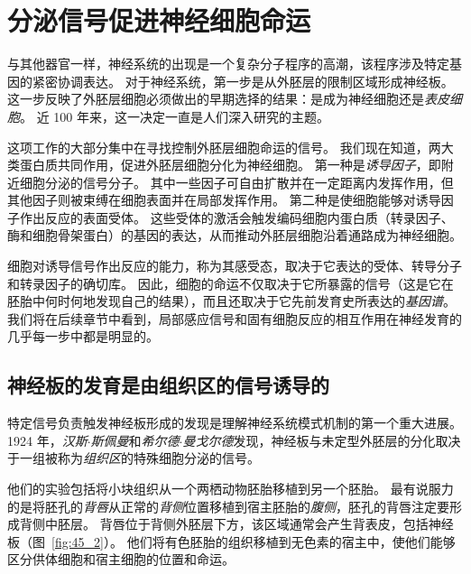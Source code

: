 \section{分泌信号促进神经细胞命运}

与其他器官一样，神经系统的出现是一个复杂分子程序的高潮，该程序涉及特定基因的紧密协调表达。
对于神经系统，第一步是从外胚层的限制区域形成神经板。
这一步反映了外胚层细胞必须做出的早期选择的结果：是成为神经细胞还是\textit{表皮细胞}。
近 100 年来，这一决定一直是人们深入研究的主题。


这项工作的大部分集中在寻找控制外胚层细胞命运的信号。
我们现在知道，两大类蛋白质共同作用，促进外胚层细胞分化为神经细胞。
第一种是\textit{诱导因子}，即附近细胞分泌的信号分子。
其中一些因子可自由扩散并在一定距离内发挥作用，但其他因子则被束缚在细胞表面并在局部发挥作用。
第二种是使细胞能够对诱导因子作出反应的表面受体。
这些受体的激活会触发编码细胞内蛋白质（转录因子、酶和细胞骨架蛋白）的基因的表达，从而推动外胚层细胞沿着通路成为神经细胞。


细胞对诱导信号作出反应的能力，称为其感受态，取决于它表达的受体、转导分子和转录因子的确切库。
因此，细胞的命运不仅取决于它所暴露的信号（这是它在胚胎中何时何地发现自己的结果），而且还取决于它先前发育史所表达的\textit{基因谱}。
我们将在后续章节中看到，局部感应信号和固有细胞反应的相互作用在神经发育的几乎每一步中都是明显的。



\subsection{神经板的发育是由组织区的信号诱导的}

特定信号负责触发神经板形成的发现是理解神经系统模式机制的第一个重大进展。
1924 年，\textit{汉斯$\cdot$斯佩曼}和\textit{希尔德$\cdot$曼戈尔德}发现，神经板与未定型外胚层的分化取决于一组被称为\textit{组织区}的特殊细胞分泌的信号。


他们的实验包括将小块组织从一个两栖动物胚胎移植到另一个胚胎。
最有说服力的是将胚孔的\textit{背唇}从正常的\textit{背侧}位置移植到宿主胚胎的\textit{腹侧}，胚孔的背唇注定要形成背侧中胚层。
背唇位于背侧外胚层下方，该区域通常会产生背表皮，包括神经板（图~\ref{fig:45_2}）。
他们将有色胚胎的组织移植到无色素的宿主中，使他们能够区分供体细胞和宿主细胞的位置和命运。



